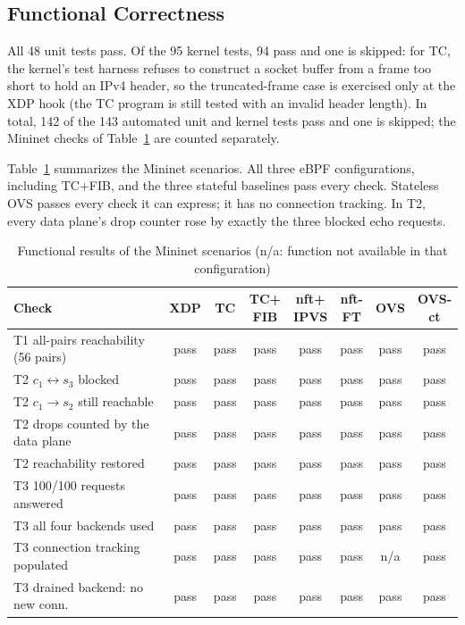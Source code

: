 \documentclass[conference]{IEEEtran}
\begin{document}
\subsection{Functional Correctness}
All 48 unit tests pass. Of the 95 kernel tests, 94 pass and one is skipped:
for TC, the kernel's test harness refuses to construct a socket buffer from a
frame too short to hold an IPv4 header, so the truncated-frame case is
exercised only at the XDP hook (the TC program is still tested with an
invalid header length). In total, 142 of the 143 automated unit and kernel
tests pass and one is skipped; the Mininet checks of Table~\ref{tab:correct}
are counted separately.

Table~\ref{tab:correct} summarizes the Mininet scenarios. All three eBPF
configurations, including TC+FIB, and the three stateful baselines pass every
check. Stateless OVS passes every check it can express; it has no connection
tracking. In T2, every data plane's drop counter rose by exactly the three
blocked echo requests.

\begin{table}[t]
\caption{Functional results of the Mininet scenarios (n/a: function not
available in that configuration)}
\label{tab:correct}
\centering\scriptsize
\setlength{\tabcolsep}{1.6pt}
\begin{tabular}{@{}lccccccc@{}}
\toprule
Check & XDP & TC & \shortstack{TC+\\FIB} & \shortstack{nft+\\IPVS} & \shortstack{nft-\\FT} & OVS & \shortstack{OVS-\\ct} \\
\midrule
T1 all-pairs reachability (56 pairs) & pass & pass & pass & pass & pass & pass & pass \\
T2 $c_1 \leftrightarrow s_3$ blocked & pass & pass & pass & pass & pass & pass & pass \\
T2 $c_1 \to s_2$ still reachable & pass & pass & pass & pass & pass & pass & pass \\
T2 drops counted by the data plane & pass & pass & pass & pass & pass & pass & pass \\
T2 reachability restored & pass & pass & pass & pass & pass & pass & pass \\
T3 100/100 requests answered & pass & pass & pass & pass & pass & pass & pass \\
T3 all four backends used & pass & pass & pass & pass & pass & pass & pass \\
T3 connection tracking populated & pass & pass & pass & pass & pass & n/a & pass \\
T3 drained backend: no new conn. & pass & pass & pass & pass & pass & pass & pass \\
\bottomrule
\end{tabular}
\end{table}
\end{document}
